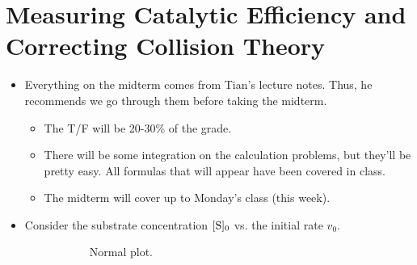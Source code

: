 \documentclass[../notes.tex]{subfiles}
\begin{document}
\section{Measuring Catalytic Efficiency and Correcting Collision Theory}
\begin{itemize}
    \item {}Everything on the midterm comes from Tian's lecture notes. Thus, he recommends we go through them before taking the midterm.
    \begin{itemize}
        \item The T/F will be 20-30\% of the grade.
        \item There will be some integration on the calculation problems, but they'll be pretty easy. All formulas that will appear have been covered in class.
        \item The midterm will cover up to Monday's class (this week).
    \end{itemize}
    \item Consider the substrate concentration $\cnc[0]{S}$ vs. the initial rate $v_0$.
    \begin{figure}[h!]
        \centering
        \begin{subfigure}[b]{0.45\linewidth}
            \centering
            \caption{Normal plot.}
            \label{fig:v0S0a}
        \end{subfigure}
        \begin{subfigure}[b]{0.45\linewidth}
            \centering
\end{subfigure}
\end{figure}
\end{itemize}
\end{document}

